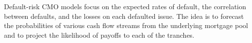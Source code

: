 \documentclass[11pt]{article}
\begin{document}
Default-risk CMO models focus on the expected rates of default, the correlation between defaults, and the losses on each defaulted issue. The idea is to forecast the probabilities of various cash flow streams from the underlying mortgage pool and to project the likelihood of payoffs to each of the tranches.
\end{document}
